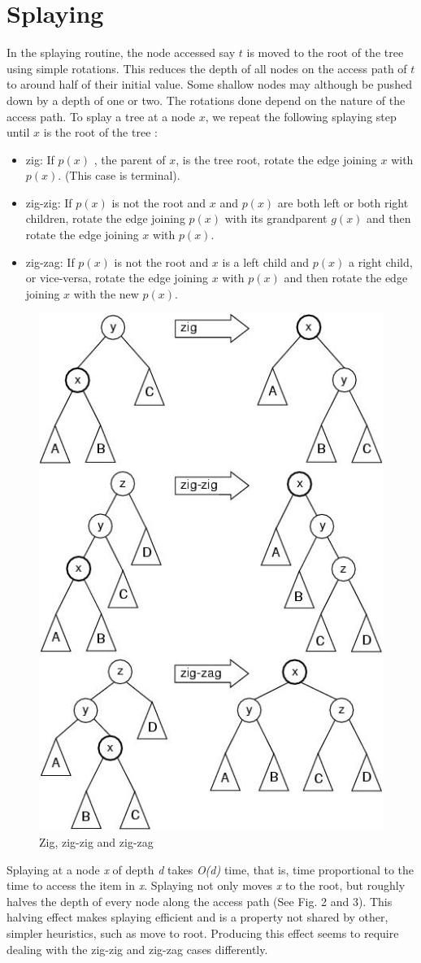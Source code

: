 \documentclass{article}
\begin{document}
\section{Splaying}
In the splaying routine, the node accessed say $t$ is moved to the root of the tree using simple rotations. This reduces the depth of all nodes on the access path of $t$ to around half of their initial value. Some shallow nodes may although be pushed down by a depth of one or two. The rotations done depend on the nature of the access path.  To splay a tree at a node $x$, we repeat the following splaying step until $x$ is the root of the tree :
\begin{itemize}
\item zig:  If $p(x)$ , the parent of $x$, is the tree root, rotate the edge joining $x$ with $p(x)$. (This case is terminal).
\item zig-zig:  If $p(x)$ is not the root and $x$ and $p(x)$ are both left or both right children, rotate the edge joining $p(x)$ with its grandparent $g(x)$ and then rotate the edge joining $x$ with $p(x)$.
\item zig-zag:  If $p(x)$ is not the root and $x$ is a left child and $p(x)$ a right child, or vice-versa, rotate the edge joining $x$ with $p(x)$ and then rotate the edge joining $x$ with the new $p(x)$.
\end{itemize}
\begin{figure}[!htpb]
	\label{fig:rot}
	\begin{center}
		\includegraphics[width=0.4\columnwidth,height=0.6\columnwidth]{zigzag2.jpg}
	\end{center}
	\caption{Zig, zig-zig and zig-zag}
\end{figure}
Splaying at a node \emph{x} of depth \emph{d} takes \emph{O(d)} time, that is, time proportional to the time to access the item in \emph{x}. Splaying not only moves \emph{x} to the root, but roughly halves the depth of every node along the access path (See Fig. 2 and 3). This halving effect makes splaying efficient and is a property not shared by other, simpler heuristics, such as move to root. Producing this effect seems to require dealing with the zig-zig and zig-zag cases differently.
\end{document}
